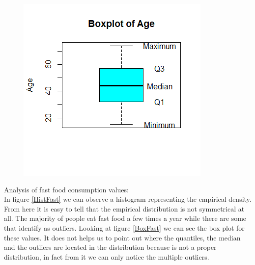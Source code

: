 \begin{figure}[ht!]
\begin{minipage}{.5\textwidth}
  \includegraphics[width=1\linewidth]{root/Box_age.png}
  \label{BoxAge}
\end{minipage}
\end{figure}
\newpage
Analysis of fast food consumption values: \\
In figure \ref{HistFast} we can observe a histogram representing the empirical density. From here it is easy to tell that the empirical distribution is not symmetrical at all. The majority of people eat fast food a few times a year while there are some that identify as outliers. Looking at figure \ref{BoxFast} we can see the box plot for these values. It does not helps us to point out where the quantiles, the median and the outliers are located in the distribution because is not a proper distribution, in fact from it we can only notice the multiple outliers. \\ 

